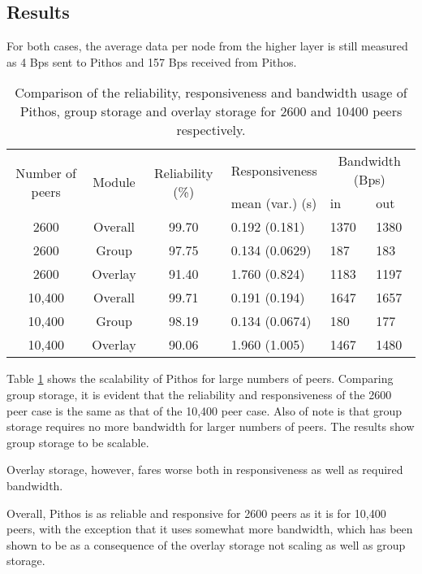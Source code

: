 \subsection{Results}

For both cases, the average data per node from the higher layer is still measured as 4 Bps sent to Pithos and 157 Bps received from Pithos.

\begin{table}[htbp]
\centering
\begin{tabular}{|c|c|c|l|l|l|}
\hline
\multirow{2}{*}{Number of peers} & \multirow{2}{*}{Module} & \multirow{2}{*}{Reliability (\%)} & Responsiveness  & \multicolumn{2}{c|}{Bandwidth (Bps)} \\
\cline{5-6}
                &        &             &  mean (var.) (s)            &in & out   \\
\hline
2600            & Overall&  99.70     &   0.192 (0.181)      & 1370&1380 \\
2600            & Group  &  97.75     &   0.134 (0.0629)     & 187&183   \\
2600            & Overlay&  91.40     &   1.760 (0.824)      & 1183&1197 \\
10,400          & Overall&  99.71     &   0.191 (0.194)      & 1647&1657 \\
10,400          & Group  &  98.19     &   0.134 (0.0674)     & 180&177   \\
10,400          & Overlay&  90.06     &   1.960 (1.005)      & 1467&1480 \\
\hline
\end{tabular}
\caption{Comparison of the reliability, responsiveness and bandwidth usage of Pithos, group storage and overlay storage for 2600 and 10400 peers respectively.}
\label{tab_pithos_scalability_results}
\end{table}
%
Table \ref{tab_pithos_scalability_results} shows the scalability of Pithos for large numbers of peers. Comparing group storage, it is evident that the reliability and responsiveness of the 2600 peer case is the same as that of the 10,400 peer case. Also of note is that group storage requires no more bandwidth for larger numbers of peers. The results show group storage to be scalable.

Overlay storage, however, fares worse both in responsiveness as well as required bandwidth.

Overall, Pithos is as reliable and responsive for 2600 peers as it is for 10,400 peers, with the exception that it uses somewhat more bandwidth, which has been shown to be as a consequence of the overlay storage not scaling as well as group storage.

